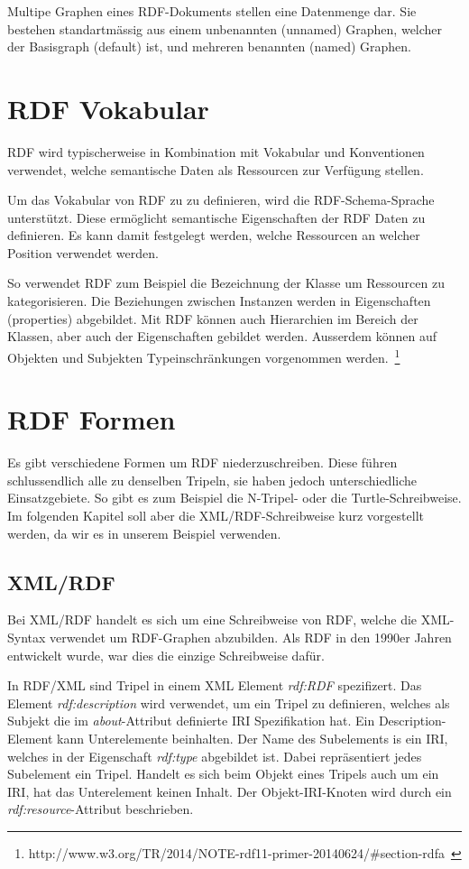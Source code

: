 Multipe Graphen eines RDF-Dokuments stellen eine Datenmenge dar. Sie bestehen standartmässig aus einem unbenannten (unnamed) Graphen, welcher der Basisgraph (default) ist, und mehreren benannten (named) Graphen.

\section{RDF Vokabular}
\label{sec:rdf_rdf_voca}
RDF wird typischerweise in Kombination mit Vokabular und Konventionen verwendet, welche semantische Daten als Ressourcen zur Verfügung stellen.

Um das Vokabular von RDF zu zu definieren, wird die RDF-Schema-Sprache unterstützt. Diese ermöglicht semantische Eigenschaften der RDF Daten zu definieren. Es kann damit festgelegt werden, welche Ressourcen an welcher Position verwendet werden.

So verwendet RDF zum Beispiel die Bezeichnung der Klasse um Ressourcen zu kategorisieren. Die Beziehungen zwischen Instanzen werden in Eigenschaften (properties) abgebildet. Mit RDF können auch Hierarchien im Bereich der Klassen, aber auch der Eigenschaften gebildet werden. Ausserdem können auf Objekten und Subjekten Typeinschränkungen vorgenommen werden.~\footnote{http://www.w3.org/TR/2014/NOTE-rdf11-primer-20140624/\#section-rdfa~\cite{w3rdf}}

\section{RDF Formen}
\label{sec:rdf_rdf_formen}
Es gibt verschiedene Formen um RDF niederzuschreiben. Diese führen schlussendlich alle zu denselben Tripeln, sie haben jedoch unterschiedliche Einsatzgebiete. So gibt es zum Beispiel die N-Tripel- oder die Turtle-Schreibweise. Im folgenden Kapitel soll aber die XML/RDF-Schreibweise kurz vorgestellt werden, da wir es in unserem Beispiel verwenden.

\subsection{XML/RDF}
\label{sec:rdf_rdf_formen_xmlRdf}
Bei XML/RDF handelt es sich um eine Schreibweise von RDF, welche die XML-Syntax verwendet um  RDF-Graphen abzubilden. Als RDF in den 1990er Jahren entwickelt wurde, war dies die einzige Schreibweise dafür.

In RDF/XML sind Tripel in einem XML Element \textit{rdf:RDF} spezifizert.  Das Element \textit{rdf:description} wird verwendet, um ein Tripel zu definieren, welches als Subjekt die im \textit{about}-Attribut definierte IRI Spezifikation hat. Ein Description-Element kann Unterelemente beinhalten. Der Name des Subelements is ein IRI, welches in der Eigenschaft \textit{rdf:type} abgebildet ist. Dabei repräsentiert jedes Subelement ein Tripel. Handelt es sich beim Objekt eines Tripels auch um ein IRI, hat das Unterelement keinen Inhalt. Der Objekt-IRI-Knoten wird durch ein \textit{rdf:resource}-Attribut beschrieben.

